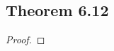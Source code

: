 \documentclass[../../main.tex]{subfiles}
\begin{document}
\subsection{Theorem 6.12}
\begin{wts}

\end{wts}
\begin{proof}

\end{proof}
\end{document}
